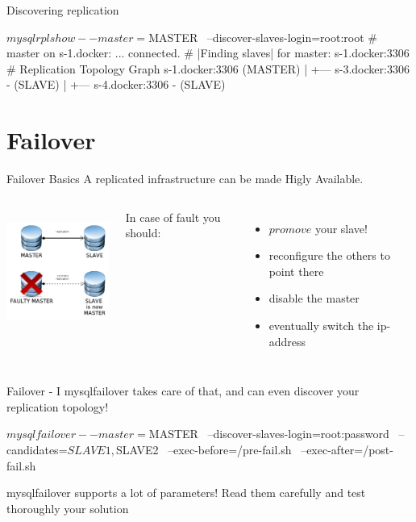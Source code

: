 \documentclass{beamer}[10]
\begin{document}
\begin{pyframe}{Discovering replication}
\begin{bashcode}
$ mysqlrplshow --master=$MASTER \
    --discover-slaves-login=root:root
# master on s-1.docker: ... connected.
# |Finding slaves| for master: s-1.docker:3306
# Replication Topology Graph
s-1.docker:3306 (MASTER)
   |
   +--- s-3.docker:3306 - (SLAVE)
   |
   +--- s-4.docker:3306 - (SLAVE)
\end{bashcode}
\end{pyframe}



%
%

\section{Failover}
\begin{pyframe}{Failover Basics}
A replicated infrastructure can be made Higly Available.
\begin{columns}

\includegraphics[height=4cm]{images/mysql-promote-slave.jpg}

%
In case of fault you should:
 \begin{itemize}
 \item $promove$ your slave!
 \item reconfigure the others to point there
 \item disable the master
 \item eventually switch the ip-address
 \end{itemize}

\end{columns}
\end{pyframe}

\begin{pyframe}{Failover - I}
mysqlfailover takes care of that, and can even discover your
replication topology!

\begin{bashcode}
$ mysqlfailover --master=$MASTER \
    --discover-slaves-login=root:password \
    --candidates=$SLAVE1,$SLAVE2 \
    --exec-before=/pre-fail.sh \
    --exec-after=/post-fail.sh
\end{bashcode}
{\large
    mysqlfailover supports a lot of parameters!
    Read them carefully and test thoroughly your
    solution
    }
\end{pyframe}
\end{document}
